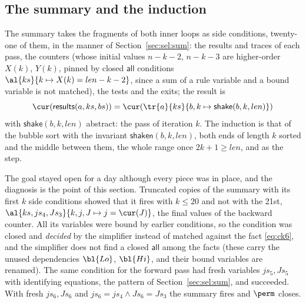 \subsection{The summary and the induction}
The summary  takes the fragments of both inner loops as side conditions,
twenty-one of them, in the manner of Section~\ref{sec:sel:sum}: the results and traces of each pass, the
counters (whose initial values $n - k - 2$, $n - k - 3$ are higher-order $X(k)$, $Y(k)$, pinned by closed
$\mathsf{all}$ conditions $\al{ks}{k \mapsto X(k) = len - k - 2}$, since a sum of a rule variable and a bound
variable is not matched), the tests and the exits; the result is
\[ \cur(\mathsf{results}(a, ks, bs)) = \cur(\tr{a}{ks}{b, k \mapsto \mathsf{shake}(b, k, len)}) \]
with $\mathsf{shake}(b, k, len)$ abstract: the pass of iteration $k$. The induction is that of the bubble sort
with the invariant $\mathsf{shaken}(b, k, len)$, both ends of length $k$ sorted and the middle between them,
the whole range once $2k + 1 \ge len$, and  as the step.

The goal stayed open for a day although every piece was in place, and the diagnosis is the point of this
section. Truncated copies of the summary with its first $k$ side conditions showed that it fires with
$k \le 20$ and not with the 21st, $\al{ks, js_4, Js_3}{k, j, J \mapsto j = \cur(J)}$, the final values of
the backward counter. All its variables were bound by earlier conditions, so the condition was closed and
\emph{decided} by the simplifier instead of matched against the fact \eqref{eq:ck6}, and the simplifier
does not find a closed $\mathsf{all}$ among the facts (these carry the unused dependencies $\bl{Lo}$, $\bl{Hi}$,
and their bound variables are renamed). The same condition for the forward pass had fresh variables
$js_5, Js_5$ with identifying equations, the pattern of Section~\ref{sec:sel:sum}, and succeeded. With
fresh $js_6, Js_6$ and $js_6 = js_4 \wedge Js_6 = Js_3$ the summary fires and $\perm$ closes.

